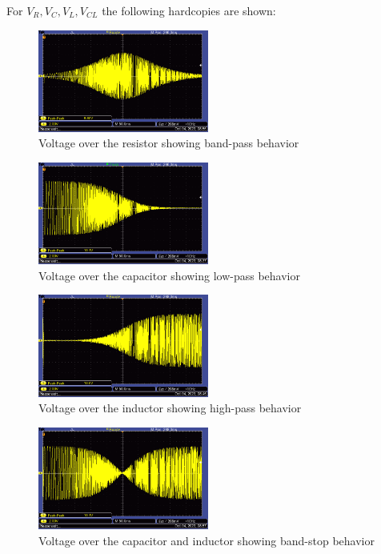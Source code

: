 For $V_R, V_C, V_L, V_{CL}$ the following hardcopies are shown:

\begin{figure}[H]
    \centering
    \includegraphics[width=0.5\textwidth]{images/prelab/V_R.png}
    \caption{Voltage over the resistor showing band-pass behavior}
    \label{fig:prelab_Vr}
\end{figure}

\begin{figure}[H]
    \centering
    \includegraphics[width=0.5\textwidth]{images/prelab/V_C.png}
    \caption{Voltage over the capacitor showing low-pass behavior}
    \label{fig:prelab_Vc}
\end{figure}

\begin{figure}[H]
    \centering
    \includegraphics[width=0.5\textwidth]{images/prelab/V_L.png}
    \caption{Voltage over the inductor showing high-pass behavior}
    \label{fig:prelab_Vl}
\end{figure}

\begin{figure}[H]
    \centering
    \includegraphics[width=0.5\textwidth]{images/prelab/V_CL.png}
    \caption{Voltage over the capacitor and inductor showing band-stop behavior}
    \label{fig:prelab_Vcl}
\end{figure}

